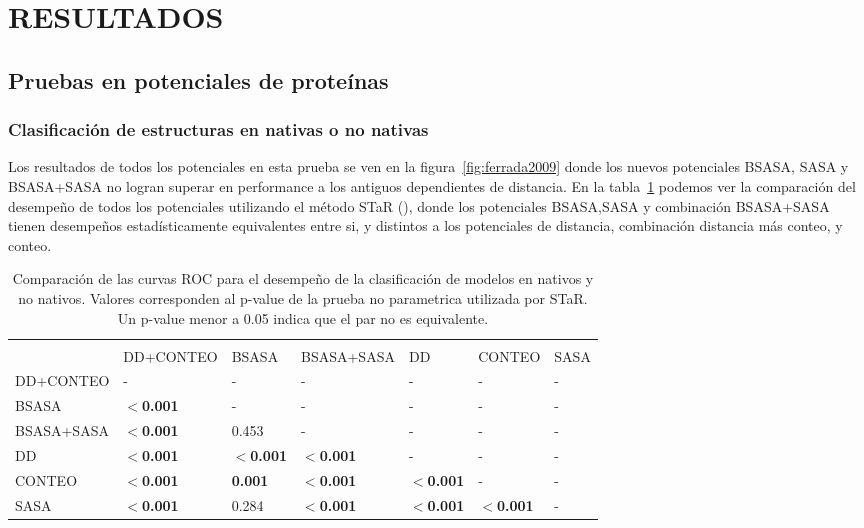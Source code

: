 \newpage
\section*{RESULTADOS}
\par{}
\subsection{Pruebas en potenciales de proteínas}
\subsubsection{Clasificación de estructuras en nativas o no nativas}
\par
Los resultados de todos los potenciales en esta prueba se ven en la figura~\ref{fig:ferrada2009} donde los nuevos potenciales BSASA, SASA y BSASA+SASA no logran superar en performance a los antiguos dependientes de distancia.
En la tabla~\ref{table:f2009res} podemos ver la comparación del desempeño de todos los potenciales utilizando el método STaR (\cite{Vergara2008}), donde los potenciales BSASA,SASA y combinación BSASA+SASA tienen desempeños estadísticamente equivalentes entre si, y distintos a los potenciales de distancia, combinación distancia más conteo, y conteo.

\begin{table}[!htp]
\begin{tabular}{p{70pt} p{70pt} p{40pt} p{70pt} p{30pt} p{40pt} p{30pt}}
\hline \\
           & DD+CONTEO & BSASA         & BSASA+SASA & DD       & CONTEO   & SASA \\
DD+CONTEO  & -         & -             & -          & -        & -        & -    \\
BSASA      & \textbf{$<$0.001}  & -             & -          & -        & -        & -    \\
BSASA+SASA & \textbf{$<$0.001}  & 0.453         & -          & -        & -        & -    \\
DD         & \textbf{$<$0.001}  & \textbf{$<$0.001}      & \textbf{$<$0.001}   & -        & -        & -    \\
CONTEO     & \textbf{$<$0.001}  & \textbf{0.001}         & \textbf{$<$0.001}   & \textbf{$<$0.001} & -        & -    \\
SASA       & \textbf{$<$0.001}  & 0.284         & \textbf{$<$0.001}   & \textbf{$<$0.001} & \textbf{$<$0.001} & -    \\
\hline
\end{tabular}
\caption[Comparación entre curvas ROC para detección de estructuras nativas y no nativas]{Comparación de las curvas ROC para el desempeño de la clasificación de modelos en nativos y no nativos. Valores corresponden al p-value de la prueba no parametrica utilizada por STaR. Un p-value menor a 0.05 indica que el par no es equivalente.}
\label{table:f2009res}
\end{table}

